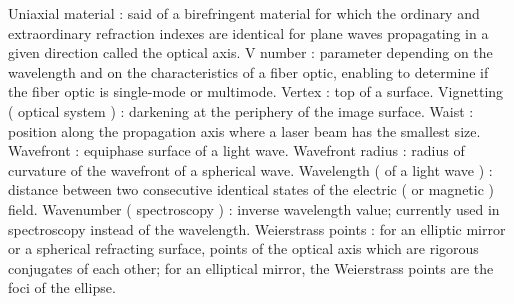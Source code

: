 Uniaxial material                                    : said of a birefringent material for which the ordinary and extraordinary refraction indexes are identical for plane waves propagating in a given direction called the optical axis.
V number                                             : parameter depending on the wavelength and on the characteristics of a fiber optic, enabling to determine if the fiber optic is single-mode or multimode.
Vertex                                               : top of a surface.
Vignetting ( optical system )                        : darkening at the periphery of the image surface.
Waist                                                : position along the propagation axis where a laser beam has the smallest size.
Wavefront                                            : equiphase surface of a light wave.
Wavefront radius                                     : radius of curvature of the wavefront of a spherical wave.
Wavelength ( of a light wave )                       : distance between two consecutive identical states of the electric ( or magnetic ) field.
Wavenumber ( spectroscopy )                          : inverse wavelength value; currently used in spectroscopy instead of the wavelength.
Weierstrass points                                   : for an elliptic mirror or a spherical refracting surface, points of the optical axis which are rigorous conjugates of each other; for an elliptical mirror, the Weierstrass points are the foci of the ellipse.
